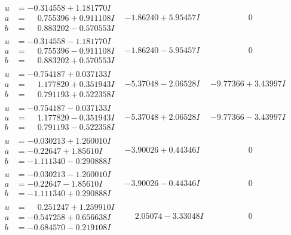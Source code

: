 \documentclass[1p]{elsarticle_modified}
\theoremstyle{definition}
\begin{document}
$$\begin{array}{c|c|c}
\begin{aligned}
u &= -0.314558 + 1.181770 I \\
a &= \phantom{-}0.755396 + 0.911108 I \\
b &= \phantom{-}0.883202 - 0.570553 I\end{aligned}
 & -1.86240 + 5.95457 I & \phantom{-0.000000 } 0 \\ \hline\begin{aligned}
u &= -0.314558 - 1.181770 I \\
a &= \phantom{-}0.755396 - 0.911108 I \\
b &= \phantom{-}0.883202 + 0.570553 I\end{aligned}
 & -1.86240 - 5.95457 I & \phantom{-0.000000 } 0 \\ \hline\begin{aligned}
u &= -0.754187 + 0.037133 I \\
a &= \phantom{-}1.177820 + 0.351943 I \\
b &= \phantom{-}0.791193 + 0.522358 I\end{aligned}
 & -5.37048 - 2.06528 I & -9.77366 + 3.43997 I \\ \hline\begin{aligned}
u &= -0.754187 - 0.037133 I \\
a &= \phantom{-}1.177820 - 0.351943 I \\
b &= \phantom{-}0.791193 - 0.522358 I\end{aligned}
 & -5.37048 + 2.06528 I & -9.77366 - 3.43997 I \\ \hline\begin{aligned}
u &= -0.030213 + 1.260010 I \\
a &= -0.22647 + 1.85610 I \\
b &= -1.111340 - 0.290888 I\end{aligned}
 & -3.90026 + 0.44346 I & \phantom{-0.000000 } 0 \\ \hline\begin{aligned}
u &= -0.030213 - 1.260010 I \\
a &= -0.22647 - 1.85610 I \\
b &= -1.111340 + 0.290888 I\end{aligned}
 & -3.90026 - 0.44346 I & \phantom{-0.000000 } 0 \\ \hline\begin{aligned}
u &= \phantom{-}0.251247 + 1.259910 I \\
a &= -0.547258 + 0.656638 I \\
b &= -0.684570 - 0.219108 I\end{aligned}
 & \phantom{-}2.05074 - 3.33048 I & \phantom{-0.000000 } 0 \\ \hline\begin{aligned}

\end{aligned}
\end{array}$$
\end{document}
